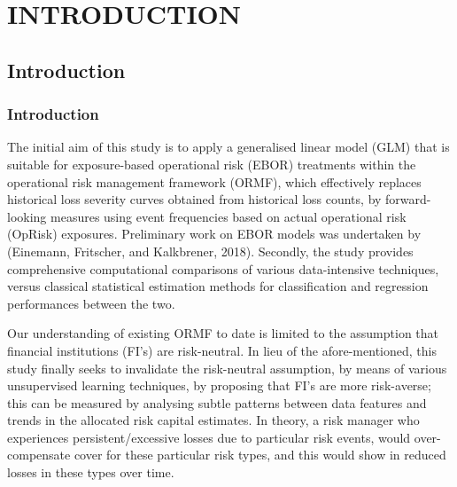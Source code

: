 \documentclass[]{DissertateUSU}
\begin{document}
\newpage

 \fancyhead[R]{\thepage} \fancyfoot[C]{}
\listoftables

\newpage

 \fancyhead[R]{\thepage} \fancyfoot[C]{}
\listoffigures

\newpage


\newpage

 \fancyhead[R]{\thepage} \fancyfoot[C]{}

\chapter{INTRODUCTION}

\section{Introduction}
\label{sec:Introduction}\subsection{Introduction}

The initial aim of this study is to apply a generalised linear model
(GLM) that is suitable for exposure-based operational risk (EBOR)
treatments within the operational risk management framework (ORMF),
which effectively replaces historical loss severity curves obtained from
historical loss counts, by forward-looking measures using event
frequencies based on actual operational risk (OpRisk) exposures.
Preliminary work on EBOR models was undertaken by (Einemann, Fritscher,
and Kalkbrener, 2018). Secondly, the study provides comprehensive
computational comparisons of various data-intensive techniques, versus
classical statistical estimation methods for classification and
regression performances between the two.

Our understanding of existing ORMF to date is limited to the assumption
that financial institutions (FI's) are risk-neutral. In lieu of the
afore-mentioned, this study finally seeks to invalidate the risk-neutral
assumption, by means of various unsupervised learning techniques, by
proposing that FI's are more risk-averse; this can be measured by
analysing subtle patterns between data features and trends in the
allocated risk capital estimates. In theory, a risk manager who
experiences persistent/excessive losses due to particular risk events,
would over-compensate cover for these particular risk types, and this
would show in reduced losses in these types over time.
\end{document}
